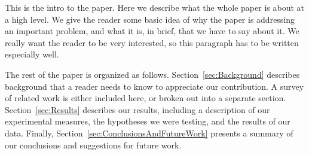 This is the intro to the paper.   Here we describe what the whole paper is
about at a high level.  We give the reader some basic idea of why the paper
is addressing an important problem, and what it is, in brief, that we
have to say about it.   We really want the reader to be very interested,
so this paragraph has to be written especially well.

The rest of the paper is organized as follows.
Section~\ref{sec:Background} describes background that a reader needs
to know to appreciate our contribution.  A survey of related
work is either included here, or broken out into a separate section.
Section~\ref{sec:Results} describes our results, including a
description of our experimental measures, the hypotheses we were
testing, and the results of our data.  Finally,
Section~\ref{sec:ConclusionsAndFutureWork} presents a summary of our
conclusions and suggestions for future work.

